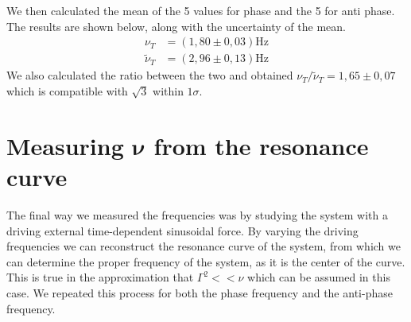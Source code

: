 \documentclass{article}
\begin{document}
We then calculated the mean of the 5 values for phase and the 5 for anti phase. The results are shown below, along with the uncertainty of the mean. 
\begin{align}
           \nu_T &= (1,80 \pm 0,03) \text{Hz} \\
    \tilde \nu_T &= (2,96 \pm 0,13) \text{Hz}
\end{align}
We also calculated the ratio between the two and obtained $ \nu_T / \tilde \nu_T = 1,65 \pm 0,07$ which is compatible with $\sqrt 3$ within $1 \sigma$.


\section{Measuring $ \bm \nu $ from the resonance curve}
The final way we measured the frequencies was by studying the system with a driving external time-dependent sinusoidal force. By varying the driving frequencies we can reconstruct the resonance curve of the system, from which we can determine the proper frequency of the system, as it is the center of the curve. This is true in the approximation that $\Gamma^2 << \nu$ which can be assumed in this case. We repeated this process for both the phase frequency and the anti-phase frequency.


\end{document}
